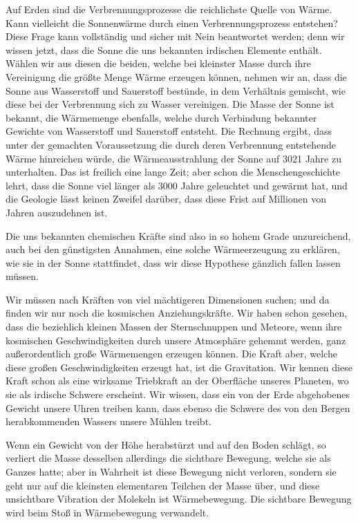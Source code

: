 \documentclass[a4paper, 11pt, oneside, german]{article}
\begin{document}
Auf Erden sind die Verbrennungsprozesse die reichlichste Quelle von Wärme. Kann vielleicht die Sonnenwärme durch einen Verbrennungsprozess entstehen? Diese Frage kann vollständig und sicher mit Nein beantwortet werden; denn wir wissen jetzt, dass die Sonne die uns bekannten irdischen Elemente enthält. Wählen wir aus diesen die beiden, welche bei kleinster Masse durch ihre Vereinigung die größte Menge Wärme erzeugen können, nehmen wir an, dass die Sonne aus Wasserstoff und Sauerstoff bestünde, in dem Verhältnis gemischt, wie diese bei der Verbrennung sich zu Wasser vereinigen. Die Masse der Sonne ist bekannt, die Wärmemenge ebenfalls, welche durch Verbindung bekannter Gewichte von Wasserstoff und Sauerstoff entsteht. Die Rechnung ergibt, dass unter der gemachten Voraussetzung die durch deren Verbrennung entstehende Wärme hinreichen würde, die Wärmeausstrahlung der Sonne auf 3021 Jahre zu unterhalten. Das ist freilich eine lange Zeit; aber schon die Menschengeschichte lehrt, dass die Sonne viel länger als 3000 Jahre geleuchtet und gewärmt hat, und die Geologie lässt keinen Zweifel darüber, dass diese Frist auf Millionen von Jahren auszudehnen ist.

Die uns bekannten chemischen Kräfte sind also in so hohem Grade unzureichend, auch bei den günstigsten Annahmen, eine solche Wärmeerzeugung zu erklären, wie sie in der Sonne stattfindet, dass wir diese Hypothese gänzlich fallen lassen müssen.

Wir müssen nach Kräften von viel mächtigeren Dimensionen suchen; und da finden wir nur noch die kosmischen Anziehungskräfte. Wir haben schon gesehen, dass die beziehlich kleinen Massen der Sternschnuppen und Meteore, wenn ihre kosmischen Geschwindigkeiten durch unsere Atmosphäre gehemmt werden, ganz außerordentlich große Wärmemengen erzeugen können. Die Kraft aber, welche diese großen Geschwindigkeiten erzeugt hat, ist die Gravitation. Wir kennen diese Kraft schon als eine wirksame Triebkraft an der Oberfläche unseres Planeten, wo sie als irdische Schwere erscheint. Wir wissen, dass ein von der Erde abgehobenes Gewicht unsere Uhren treiben kann, dass ebenso die Schwere des von den Bergen herabkommenden Wassers unsere Mühlen treibt.

Wenn ein Gewicht von der Höhe herabstürzt und auf den Boden schlägt, so verliert die Masse desselben allerdings die sichtbare Bewegung, welche sie als Ganzes hatte; aber in Wahrheit ist diese Bewegung nicht verloren, sondern sie geht nur auf die kleinsten elementaren Teilchen der Masse über, und diese unsichtbare Vibration der Molekeln ist Wärmebewegung. Die sichtbare Bewegung wird beim Stoß in Wärmebewegung verwandelt.
\end{document}

